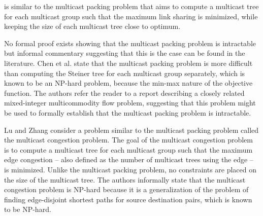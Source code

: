 


\mf is similar to the multicast packing problem \cite{Chen00} that aims to compute a multicast tree for each multicast group such that the maximum link sharing is minimized,
while keeping the size of each multicast tree close to optimum. 

No formal proof exists showing that the multicast packing problem is intractable but informal commentary suggesting that this is the case can be found in the literature. 
Chen et al. \cite{Chen00} state that the multicast packing problem is more difficult than computing the Steiner tree
for each multicast group separately, which is known to be an NP-hard problem, because the min-max nature of the objective function. 
The authors refer the reader to a report \cite{Bienstock95} describing a closely related mixed-integer
multicommodity flow problem, suggesting that this problem might be used to formally establish that the multicast packing problem is intractable.

Lu and Zhang \cite{Lu05} consider a problem similar to the multicast packing problem called the multicast congestion problem.  The goal of the multicast congestion problem is to compute a
multicast tree for each multicast group such that the maximum edge congestion -- also defined as the number of multicast trees using the edge -- is minimized.  Unlike the multicast packing problem,
no constraints are placed on the size of the multicast tree.  The authors informally state that the multicast congestion problem is NP-hard because it is a generalization of the problem of 
finding edge-disjoint shortest paths for source destination pairs, which is known to be NP-hard. 



